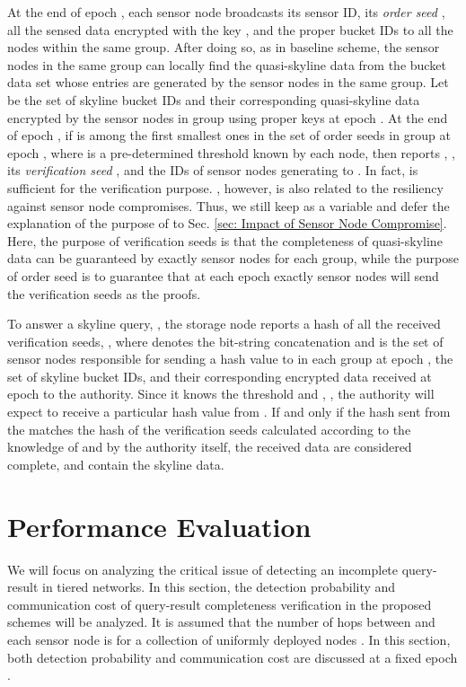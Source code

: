 \documentclass[conference]{IEEEtran}
\begin{document}
At the end of epoch , each sensor node  broadcasts its sensor ID, its \emph{order seed} , all the sensed data encrypted with the key , and the proper bucket IDs to all the nodes within the same group. After doing so, as in baseline scheme, the sensor nodes in the same group can locally find the quasi-skyline data from the bucket data set whose entries are generated by the sensor nodes in the same group. Let  be the set of skyline bucket IDs and  their corresponding quasi-skyline data encrypted by the sensor nodes in group  using proper keys at epoch . At the end of epoch , if  is among the first  smallest ones in the set of order seeds in group  at epoch , where  is a pre-determined threshold known by each node, then  reports , , its \emph{verification seed} , and the IDs of sensor nodes generating  to . In fact,  is sufficient for the verification purpose. , however, is also related to the resiliency against sensor node compromises. Thus, we still keep  as a variable and defer the explanation of the purpose of  to Sec. \ref{sec: Impact of Sensor Node Compromise}. Here, the purpose of verification seeds is that the completeness of quasi-skyline data can be guaranteed by exactly  sensor nodes for each group, while the purpose of order seed is to guarantee that at each epoch exactly  sensor nodes will send the verification seeds as the proofs.

To answer a skyline query, , the storage node  reports a hash of all the received verification seeds, , where  denotes the bit-string concatenation and  is the set of sensor nodes responsible for sending a hash value to  in each group at epoch , the set of skyline bucket IDs, and their corresponding encrypted data received at epoch  to the authority. Since it knows the threshold  and , , the authority will expect to receive a particular hash value from . If and only if the hash sent from the  matches the hash of the verification seeds calculated according to the knowledge of  and  by the authority itself, the received data are considered complete, and contain the skyline data.


\section{Performance Evaluation}\label{sec: Performance Evaluation}
We will focus on analyzing the critical issue of detecting an incomplete query-result in tiered networks. In this section, the detection probability and communication cost of query-result completeness verification in the proposed schemes will be analyzed. It is assumed that the number of hops between  and each sensor node is  for a collection of  uniformly deployed nodes \cite{cp05}. In this section, both detection probability and communication cost are discussed at a fixed epoch .
\end{document}
